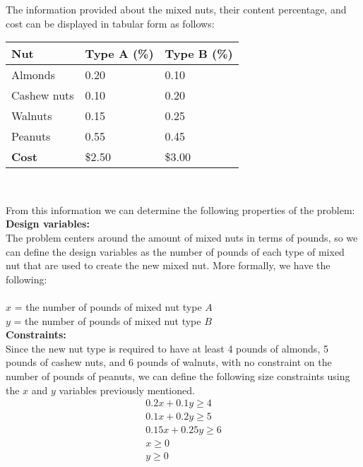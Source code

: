 \documentclass[11pt]{article}
\begin{document}
\begin{prob}{1}
\end{prob}
\begin{sol} 

The information provided about the mixed nuts, their content percentage, and cost can be displayed in tabular form as follows: \\

\begin{center}
\begin{tabular}{|l|l|l|}
\hline
\textbf{Nut} & \textbf{Type A (\%)} & \textbf{Type B (\%)} \\
\hline
Almonds & 0.20 & 0.10 \\
Cashew nuts & 0.10 & 0.20 \\
Walnuts & 0.15 & 0.25 \\
Peanuts & 0.55 & 0.45 \\
\hline
\textbf{Cost} & \$2.50 & \$3.00 \\
\hline
\end{tabular}  \\
\end{center}

From this information we can determine the following properties of the problem: \\

\textbf{Design variables:} \\ 
The problem centers around the amount of mixed nuts in terms of pounds, so we can define the design variables as the number of pounds of each type of mixed nut that are used to create the new mixed nut. More formally, we have the following: \\ \\
$x$ = the number of pounds of mixed nut type $A$ \\
$y$ = the number of pounds of mixed nut type $B$ \\

\textbf{Constraints:}  \\
Since the new nut type is required to have at least 4 pounds of almonds, 5 pounds of cashew nuts, and 6 pounds of walnuts, with no constraint on the number of pounds of peanuts, we can define the following size constraints using the $x$ and $y$ variables previously mentioned. 
\begin{eqnarray*}
0.2x + 0.1y \geq 4 \\
0.1x + 0.2y \geq 5 \\
0.15x + 0.25y \geq 6 \\
x \geq 0 \\
y \geq 0 
\end{eqnarray*}


\end{sol}
\end{document}
